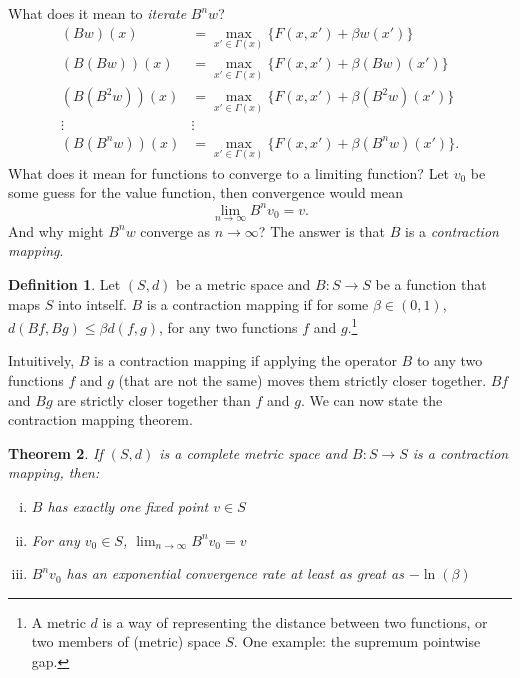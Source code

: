 \documentclass[11pt]{extarticle}
\theoremstyle{plain}
\newtheorem{thm}{Theorem}
\theoremstyle{definition}
\newtheorem{defn}[thm]{Definition}
\begin{document}
What does it mean to \textit{iterate} $B^n w$?
\begin{align*}
	(Bw) (x) &= \max_{x' \in \Gamma(x)} \bigg\{ F(x, x') + \beta w(x') \bigg\} \\
	(B(Bw)) (x) &= \max_{x' \in \Gamma(x)} \bigg\{ F(x, x') + \beta (Bw)(x') \bigg\} \\
	(B(B^2w)) (x) &= \max_{x' \in \Gamma(x)} \bigg\{ F(x, x') + \beta (B^2w)(x') \bigg\} \\
	\vdots & \vdots  \\
	(B(B^nw)) (x) &= \max_{x' \in \Gamma(x)} \bigg\{ F(x, x') + \beta (B^nw)(x') \bigg\}.
\end{align*}
What does it mean for functions to converge to a limiting function? Let $v_0$ be some guess for the value function, then convergence would mean
\begin{equation*}
	\lim_{n \to \infty} B^n v_0 = v.
\end{equation*}
And why might $B^n w$ converge as $n \to \infty$? The answer is that $B$ is a \textit{contraction mapping}.


\vspace{5mm}
\begin{defn}
	
	Let $(S, d)$ be a metric space and $B: S \to S$ be a function that maps $S$ into intself. $B$ is a contraction mapping if for some $\beta \in (0, 1)$, $d(Bf, Bg) \leq \beta d(f, g)$, for any two functions $f$ and $g$.\footnote{
		A metric $d$ is a way of representing the distance between two functions, or two members of (metric) space $S$. One example: the supremum pointwise gap.
	}
	
\end{defn}


\vspace{5mm}
\noindent
Intuitively, $B$ is a contraction mapping if applying the operator $B$ to any two functions $f$ and $g$ (that are not the same) moves them strictly closer together. $Bf$ and $Bg$ are strictly closer together than $f$ and $g$. We can now state the contraction mapping theorem. 


\vspace{5mm}
\begin{thm}

	If $(S, d)$ is a complete metric space and $B: S \to S$ is a contraction mapping, then: 
	\begin{enumerate}[(i)]
		\item $B$ has exactly one fixed point $v \in S$
		\item For any $v_0 \in S$, $\lim_{n \to \infty} B^n v_0 = v$
		\item $B^n v_0$ has an exponential convergence rate at least as great as $- \ln(\beta)$
	\end{enumerate}
	
\end{thm}
\end{document}
